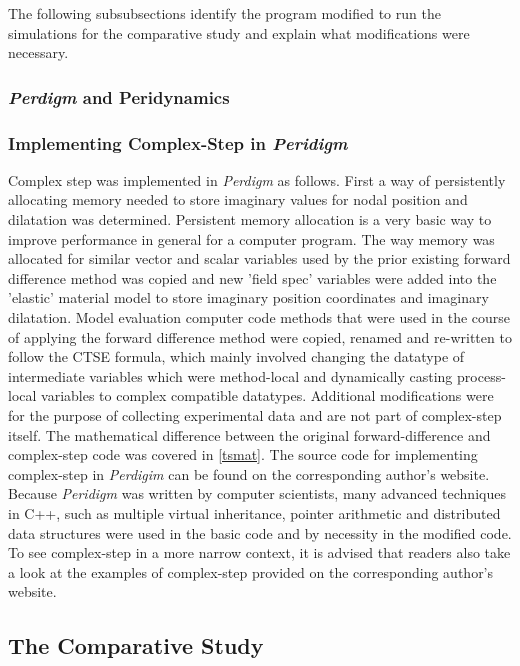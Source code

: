 \documentclass[preprint,12pt]{elsarticle}
\begin{document}
The following subsubsections identify the program modified to run the simulations for the
comparative study and explain what modifications were necessary.

\subsubsection{\emph{Perdigm} and Peridynamics} 
\subsubsection{Implementing Complex-Step in \emph{Peridigm}} 

Complex step was implemented in \emph{Perdigm} as follows. First a way of persistently allocating
memory needed to store imaginary values for nodal position and dilatation was determined. Persistent
memory allocation is a very basic way to improve performance in general for a computer program. The way
memory was allocated for similar vector and scalar variables used by the prior existing forward
difference method was copied and new 'field spec' variables were added into the 'elastic' material
model to store imaginary position coordinates and imaginary dilatation. Model evaluation computer
code methods that were used in the course of applying the forward difference method were copied,
renamed and re-written to follow the CTSE formula, which mainly involved changing the datatype of
intermediate variables which were method-local and dynamically casting process-local variables to
complex compatible datatypes. Additional modifications were for the purpose of collecting
experimental data and are not part of complex-step itself. The mathematical difference between the
original forward-difference and complex-step code was covered in \ref{tsmat}. The source code for
implementing complex-step in \emph{Perdigim} can be found on the corresponding author's website. Because
\emph{Peridigm} was written by computer scientists, many advanced techniques in C++, such as
multiple virtual inheritance, pointer arithmetic and distributed data structures were used in the
basic code and by necessity in the modified code. To see complex-step in a more narrow context, it
is advised that readers also take a look at the examples of complex-step provided on the
corresponding author's website.

\subsection{The Comparative Study} 
\end{document}
